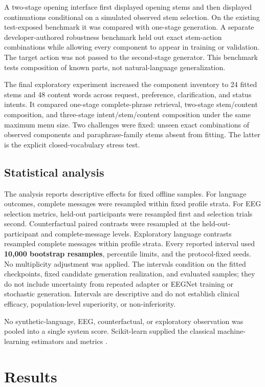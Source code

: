 \documentclass[11pt]{article}
\begin{document}
A two-stage opening interface first displayed opening stems and then displayed continuations conditional on a simulated observed stem selection. On the existing test-exposed benchmark it was compared with one-stage generation. A separate developer-authored robustness benchmark held out exact stem-action combinations while allowing every component to appear in training or validation. The target action was not passed to the second-stage generator. This benchmark tests composition of known parts, not natural-language generalization.


The final exploratory experiment increased the component inventory to 24 fitted stems and 48 content words across request, preference, clarification, and status intents. It compared one-stage complete-phrase retrieval, two-stage stem/content composition, and three-stage intent/stem/content composition under the same maximum menu size. Two challenges were fixed: unseen exact combinations of observed components and paraphrase-family stems absent from fitting. The latter is the explicit closed-vocabulary stress test.


\subsection{Statistical analysis}

The analysis reports descriptive effects for fixed offline samples. For language outcomes, complete messages were resampled within fixed profile strata. For EEG selection metrics, held-out participants were resampled first and selection trials second. Counterfactual paired contrasts were resampled at the held-out-participant and complete-message levels. Exploratory language contrasts resampled complete messages within profile strata. Every reported interval used \textbf{10,000 bootstrap resamples}, percentile limits, and the protocol-fixed seeds. No multiplicity adjustment was applied. The intervals condition on the fitted checkpoints, fixed candidate generation realization, and evaluated samples; they do not include uncertainty from repeated adapter or EEGNet training or stochastic generation. Intervals are descriptive and do not establish clinical efficacy, population-level superiority, or non-inferiority.


No synthetic-language, EEG, counterfactual, or exploratory observation was pooled into a single system score. Scikit-learn supplied the classical machine-learning estimators and metrics \cite{pedregosa2011}.


\section{Results}
\end{document}
